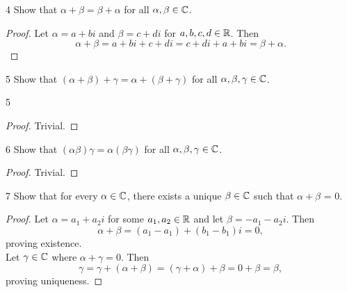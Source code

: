 \documentclass[12pt, letterpaper]{article}
\begin{document}
\begin{problem}{4}
Show that $\alpha + \beta = \beta + \alpha$ for all $\alpha,\beta\in\mathbb{C}$.
\end{problem}

\begin{proof}
Let $\alpha = a + bi$ and $\beta = c + di$ for $a,b,c,d\in\mathbb{R}$. Then
$$\alpha + \beta = a + bi + c + di = c + di + a + bi = \beta + \alpha.$$
\end{proof}

\begin{problem}{5}
Show that $(\alpha+\beta)+\gamma=\alpha+(\beta+\gamma)$ for all $\alpha,\beta,\gamma\in\mathbb{C}$.
\end{problem}{5}

\begin{proof}
Trivial.
\end{proof}

\begin{problem}{6}
Show that $(\alpha\beta)\gamma=\alpha(\beta\gamma)$ for all $\alpha,\beta,\gamma\in\mathbb{C}$.
\end{problem}

\begin{proof}
Trivial.
\end{proof}

\begin{problem}{7}
Show that for every $\alpha\in\mathbb{C}$, there exists a unique $\beta\in\mathbb{C}$ such that $\alpha+\beta$ = 0.
\end{problem}

\begin{proof}
Let $\alpha=a_1+a_2i$ for some $a_1,a_2\in\mathbb{R}$ and let $\beta = -a_1-a_2i$. Then
$$\alpha+\beta=(a_1-a_1)+(b_1-b_1)i=0,$$
proving existence. 
\\Let $\gamma\in\mathbb{C}$ where $\alpha+\gamma=0$. Then
$$\gamma = \gamma + (\alpha + \beta) = (\gamma + \alpha) +\beta = 0 + \beta = \beta,$$
proving uniqueness.
\end{proof}
\end{document}
